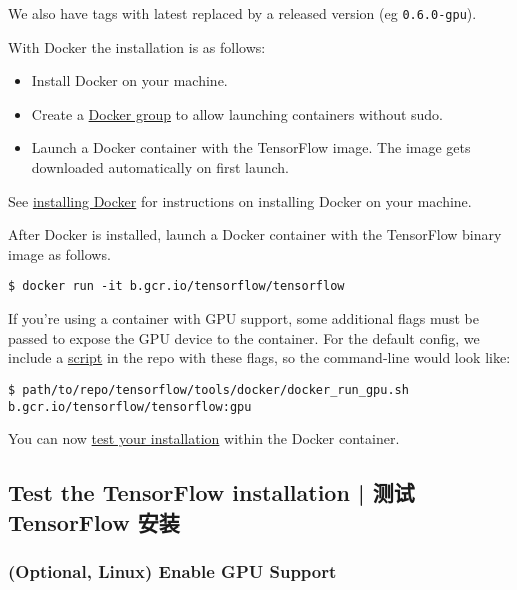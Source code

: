 We also have tags with latest replaced by a released version (eg \lstinline{0.6.0-gpu}).

With Docker the installation is as follows:

\begin{itemize}
\item Install Docker on your machine.
\item Create a \href{http://docs.docker.com/engine/installation/ubuntulinux/#create-a-docker-group}{Docker group} to allow launching containers without sudo.
\item Launch a Docker container with the TensorFlow image. The image gets downloaded automatically on first launch.
\end{itemize}

See \href{http://docs.docker.com/engine/installation/}{installing Docker} for instructions on installing Docker on your machine.

After Docker is installed, launch a Docker container with the TensorFlow binary image as follows.

\begin{lstlisting}
$ docker run -it b.gcr.io/tensorflow/tensorflow
\end{lstlisting}

If you're using a container with GPU support, some additional flags must be passed to expose the GPU device to the container. For the default config, we include a \href{https://github.com/tensorflow/tensorflow/blob/master/tensorflow/tools/docker/docker_run_gpu.sh}{script} in the repo with these flags, so the command-line would look like:

\begin{lstlisting}
$ path/to/repo/tensorflow/tools/docker/docker_run_gpu.sh b.gcr.io/tensorflow/tensorflow:gpu
\end{lstlisting}

You can now \hyperref[test_install]{test your installation} within the Docker container.


%
\subsection {Test the TensorFlow installation  |  测试 TensorFlow 安装} \label{test_install}

\subsubsection {(Optional, Linux) Enable GPU Support}

